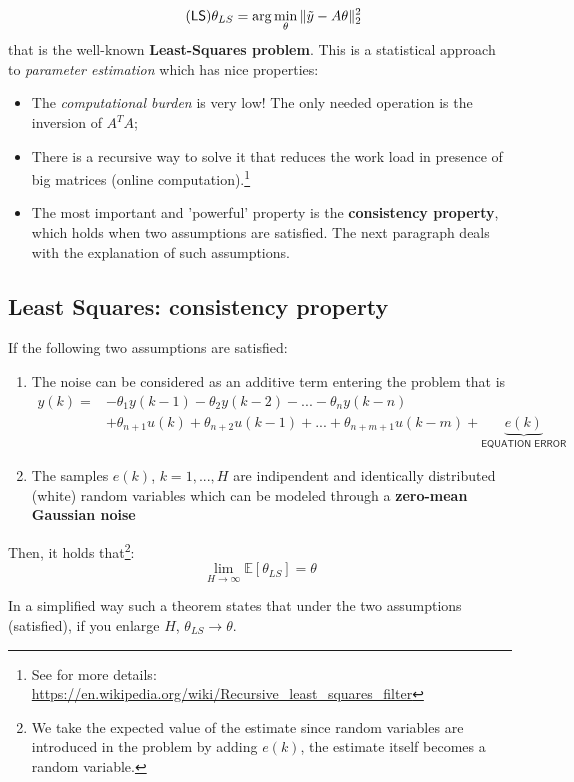 \begin{equation} \label{eq:LS} \tag{\textsf{LS}}
    \theta_{LS}=\arg\min_{\theta} \Vert \tilde{y}-A\theta \Vert_2^2
\end{equation}
that is the well-known \textbf{Least-Squares problem}. This is a statistical approach to \textit{parameter estimation} which has nice properties:
\begin{itemize}
    \item The \textit{computational burden} is very low! The only needed operation is the inversion of $A^T{A}$;
    \item There is a recursive way to solve it that reduces the work load in presence of big matrices (online computation).\footnote{
        See for more details: \url{https://en.wikipedia.org/wiki/Recursive_least_squares_filter}%
    }
    \item The most important and 'powerful' property is the \textbf{consistency property}, which holds when two assumptions are satisfied. The next paragraph deals with the explanation of such assumptions.
\end{itemize}

\subsection{Least Squares: consistency property}
\begin{theorem} If the following two assumptions are satisfied:
\begin{enumerate}
    \item The noise can be considered as an additive term entering the problem that is
    \begin{align*}
        y(k) = &-\theta_1{y(k-1)}-\theta_2{y(k-2)}-...-\theta_n{y(k-n)}\\
        &+\theta_{n+1}u(k)+\theta_{n+2}u(k-1)+...+\theta_{n+m+1}u(k-m) + \underbrace{e(k)}_{\textsf{EQUATION ERROR}}
    \end{align*}
    \item The samples $e(k)$, $k=1,...,H$ are indipendent and identically distributed (white) random variables which can be modeled through a \textbf{zero-mean Gaussian noise}
\end{enumerate}
Then, it holds that\footnote{
    We take the expected value of the estimate since random variables are introduced in the problem by adding $e(k)$, the estimate itself becomes a random variable.
}:
\begin{equation}\label{eq:consistency}
    \lim_{H\to\infty} \mathbb{E}[\theta_{LS}] = \theta
\end{equation}
\end{theorem}
In a simplified way such a theorem states that under the two assumptions (satisfied), if you enlarge $H$, $\theta_{LS}\to\theta$.

